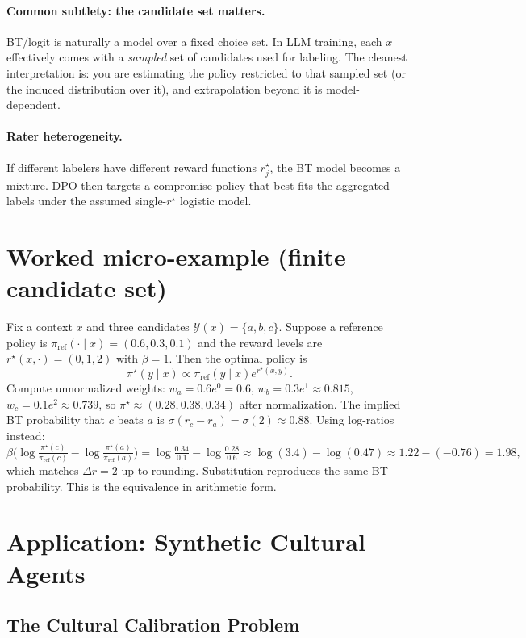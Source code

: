 \documentclass[11pt]{article}
\newcommand{\1}{\mathbf{1}}
\newcommand{\sigmoid}{\sigma}
\theoremstyle{plain}
\theoremstyle{definition}
\theoremstyle{remark}
\begin{document}
\paragraph{Common subtlety: the candidate set matters.}
BT/logit is naturally a model over a fixed choice set. In LLM training, each $x$ effectively comes with a \emph{sampled} set of candidates
used for labeling. The cleanest interpretation is: you are estimating the policy restricted to that sampled set (or the induced distribution
over it), and extrapolation beyond it is model-dependent.

\paragraph{Rater heterogeneity.}
If different labelers have different reward functions $r^\star_j$, the BT model becomes a mixture. DPO then targets a compromise policy
that best fits the aggregated labels under the assumed single-$r^\star$ logistic model.

\section{Worked micro-example (finite candidate set)}
Fix a context $x$ and three candidates $\mathcal{Y}(x)=\{a,b,c\}$. Suppose a reference policy is
$\pi_{\mathrm{ref}}(\cdot\mid x)=(0.6, 0.3, 0.1)$ and the reward levels are $r^\star(x,\cdot)=(0,1,2)$ with $\beta=1$.
Then the optimal policy is
\[
\pi^\star(y\mid x)\propto \pi_{\mathrm{ref}}(y\mid x)e^{r^\star(x,y)}.
\]
Compute unnormalized weights:
$w_a=0.6e^0=0.6$, $w_b=0.3e^1\approx0.815$, $w_c=0.1e^2\approx0.739$,
so $\pi^\star\approx(0.28,0.38,0.34)$ after normalization.
The implied BT probability that $c$ beats $a$ is
$\sigmoid(r_c-r_a)=\sigmoid(2)\approx0.88$.
Using log-ratios instead:
\[
\beta\Big(\log\tfrac{\pi^\star(c)}{\pi_{\mathrm{ref}}(c)}-\log\tfrac{\pi^\star(a)}{\pi_{\mathrm{ref}}(a)}\Big)
= \log\tfrac{0.34}{0.1}-\log\tfrac{0.28}{0.6}\approx \log(3.4)-\log(0.47)\approx 1.22-(-0.76)=1.98,
\]
which matches $\Delta r=2$ up to rounding. Substitution reproduces the same BT probability. This is the equivalence in arithmetic form.

\newpage
\section{Application: Synthetic Cultural Agents}

\subsection{The Cultural Calibration Problem}
\end{document}
